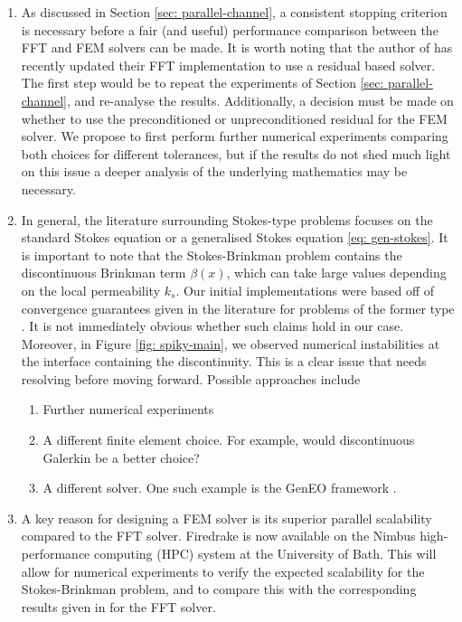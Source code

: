 \documentclass[12pt]{article}
\theoremstyle{theorem}
\begin{document}
\begin{enumerate}
    \item As discussed in Section \ref{sec: parallel-channel}, a consistent stopping criterion is necessary before a fair (and useful) performance comparison between the FFT and FEM solvers can be made. It is worth noting that the author of \cite{chen2023} has recently updated their FFT implementation to use a residual based solver. The first step would be to repeat the experiments of Section \ref{sec: parallel-channel}, and re-analyse the results. Additionally, a decision must be made on whether to use the preconditioned or unpreconditioned residual for the FEM solver. We propose to first perform further numerical experiments comparing both choices for different tolerances, but if the results do not shed much light on this issue a deeper analysis of the underlying mathematics may be necessary.
    \item In general, the literature surrounding Stokes-type problems focuses on the standard Stokes equation or a generalised Stokes equation \eqref{eq: gen-stokes}. It is important to note that the Stokes-Brinkman problem contains the discontinuous Brinkman term $\beta(x)$, which can take large values depending on the local permeability $k_s$. Our initial implementations were based off of convergence guarantees given in the literature for problems of the former type \cite{larin2008,braess1997}. It is not immediately obvious whether such claims hold in our case. Moreover, in Figure \ref{fig: spiky-main}, we observed numerical instabilities at the interface containing the discontinuity. This is a clear issue that needs resolving before moving forward. Possible approaches include
    \begin{enumerate}
        \item Further numerical experiments
        \item A different finite element choice. For example, would discontinuous Galerkin be a better choice?
        \item A different solver. One such example is the GenEO framework \cite{spillane2021abstract}.
    \end{enumerate}
    \item A key reason for designing a FEM solver is its superior parallel scalability compared to the FFT solver. Firedrake is now available on the Nimbus high-performance computing (HPC) system at the University of Bath. This will allow for numerical experiments to verify the expected scalability for the Stokes-Brinkman problem, and to compare this with the corresponding results given in \cite{chen2023} for the FFT solver.
\end{enumerate}
\end{document}

